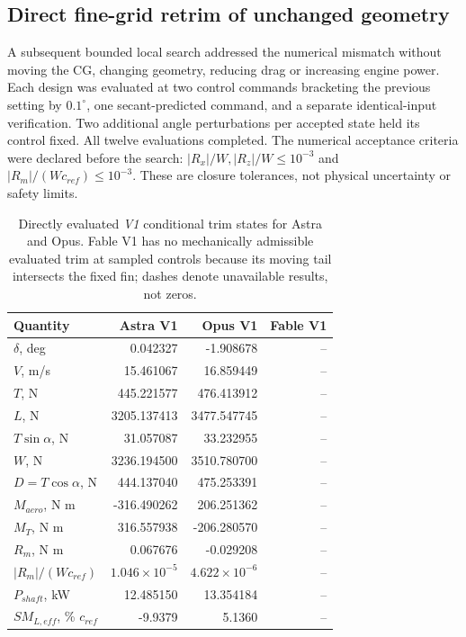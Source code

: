 \documentclass[11pt,a4paper]{article}
\begin{document}
\subsection{Direct fine-grid retrim of unchanged geometry}
A subsequent bounded local search addressed the numerical mismatch without moving the CG, changing geometry, reducing drag or increasing engine power. Each design was evaluated at two control commands bracketing the previous setting by $0.1^\circ$, one secant-predicted command, and a separate identical-input verification. Two additional angle perturbations per accepted state held its control fixed. All twelve evaluations completed. The numerical acceptance criteria were declared before the search: $|R_x|/W,|R_z|/W\leq10^{-3}$ and $|R_m|/(Wc_{ref})\leq10^{-3}$. These are closure tolerances, not physical uncertainty or safety limits.

\begin{table}[H]\centering\small
\caption{Directly evaluated \emph{V1} conditional trim states for Astra and Opus. Fable V1 has no mechanically admissible evaluated trim at sampled controls because its moving tail intersects the fixed fin; dashes denote unavailable results, not zeros.}\label{tab:retrim}
\begin{tabular}{lrrr}\toprule
Quantity & Astra V1 & Opus V1 & Fable V1\\\midrule
$\delta$, deg &0.042327&-1.908678&--\\
$V$, m/s &15.461067&16.859449&--\\
$T$, N &445.221577&476.413912&--\\
$L$, N &3205.137413&3477.547745&--\\
$T\sin\alpha$, N &31.057087&33.232955&--\\
$W$, N &3236.194500&3510.780700&--\\
$D=T\cos\alpha$, N &444.137040&475.253391&--\\
$M_{aero}$, N m &-316.490262&206.251362&--\\
$M_T$, N m &316.557938&-206.280570&--\\
$R_m$, N m &0.067676&-0.029208&--\\
$|R_m|/(Wc_{ref})$ &$1.046\times10^{-5}$&$4.622\times10^{-6}$&--\\
$P_{shaft}$, kW &12.485150&13.354184&--\\
$SM_{L,eff}$, \% $c_{ref}$ &-9.9379&5.1360&--\\\bottomrule
\end{tabular}
\end{table}
\end{document}
